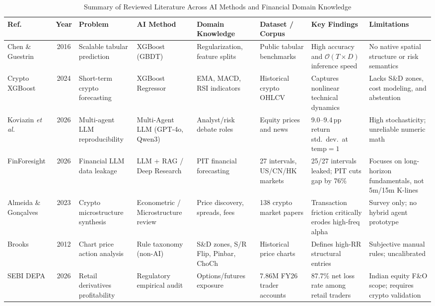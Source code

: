 \documentclass[conference]{IEEEtran}
\begin{document}
\begin{table}[t]
\centering
\caption{Summary of Reviewed Literature Across AI Methods and Financial Domain Knowledge}
\label{tab:lit_summary}
\scriptsize
\setlength{\tabcolsep}{3.5pt}
\begin{tabular}{p{2.0cm} c p{2.2cm} p{1.9cm} p{2.0cm} p{1.7cm} p{2.2cm} p{2.1cm}}
\toprule
\textbf{Ref.} & \textbf{Year} & \textbf{Problem} & \textbf{AI Method} & \textbf{Domain Knowledge} & \textbf{Dataset / Corpus} & \textbf{Key Findings} & \textbf{Limitations} \\
\midrule
Chen \& Guestrin \cite{chen2016} & 2016 & Scalable tabular prediction & XGBoost (GBDT) & Regularization, feature splits & Public tabular benchmarks & High accuracy and $\mathcal{O}(T{\times}D)$ inference speed & No native spatial structure or risk semantics \\
Crypto XGBoost \cite{arxiv2407} & 2024 & Short-term crypto forecasting & XGBoost Regressor & EMA, MACD, RSI indicators & Historical crypto OHLCV & Captures nonlinear technical dynamics & Lacks S\&D zones, cost modeling, and abstention \\
Koviazin \textit{et al.} \cite{koviazin2026} & 2026 & Multi-agent LLM reproducibility & Multi-Agent LLM (GPT-4o, Qwen3) & Analyst/risk debate roles & Equity prices and news & 9.0--9.4\,pp return std.\ dev.\ at $\text{temp}=1$ & High stochasticity; unreliable numeric math \\
FinForesight \cite{finforesight2026} & 2026 & Financial LLM data leakage & LLM + RAG / Deep Research & PIT financial forecasting & 27 intervals, US/CN/HK markets & 25/27 intervals leaked; PIT cuts gap by 76\% & Focuses on long-horizon fundamentals, not 5m/15m K-lines \\
Almeida \& Gon\c{c}alves \cite{almeida2023} & 2023 & Crypto microstructure synthesis & Econometric / Microstructure review & Price discovery, spreads, fees & 138 crypto market papers & Transaction friction critically erodes high-freq alpha & Survey only; no hybrid agent prototype \\
Brooks \cite{brooks2012} & 2012 & Chart price action analysis & Rule taxonomy (non-AI) & S\&D zones, S/R Flip, Pinbar, ChoCh & Historical price charts & Defines high-RR structural entries & Subjective manual rules; uncalibrated \\
SEBI DEPA \cite{sebi2026} & 2026 & Retail derivatives profitability & Regulatory empirical audit & Options/futures exposure & 7.86M FY26 trader accounts & 87.7\% net loss rate among retail traders & Indian equity F\&O scope; requires crypto validation \\
\bottomrule
\end{tabular}
\end{table}
\end{document}
